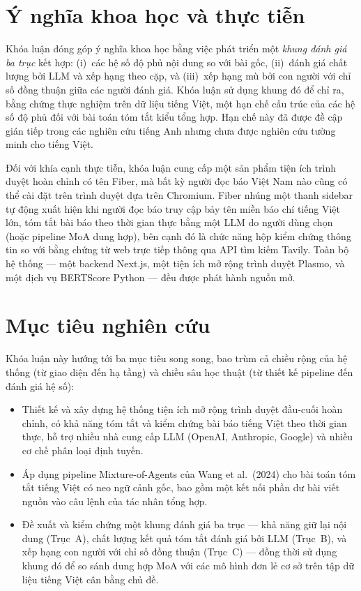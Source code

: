 \section*{Ý nghĩa khoa học và thực tiễn}

Khóa luận đóng góp ý nghĩa khoa học bằng việc phát triển một \textit{khung đánh giá ba trục} kết hợp: (i)~các hệ số độ phủ
nội dung so với bài gốc, (ii)~đánh giá chất lượng bởi LLM và xếp hạng theo
cặp, và (iii)~xếp hạng mù bởi con người với chỉ số đồng thuận giữa các người đánh giá.
Khóa luận sử dụng khung đó để chỉ ra, bằng chứng thực nghiệm trên dữ liệu tiếng
Việt, một hạn chế cấu trúc của các hệ số độ phủ đối với bài toán tóm tắt kiểu tổng
hợp. Hạn chế này đã được đề cập gián tiếp trong các nghiên cứu tiếng Anh
\cite{Wang2024,Zheng2023} nhưng chưa được nghiên cứu tường minh cho tiếng Việt.

Đối với khía cạnh thực tiễn, khóa luận cung cấp một sản phẩm tiện ích trình duyệt hoàn chỉnh có tên Fiber, mà bất
kỳ người đọc báo Việt Nam nào cũng có thể cài đặt trên trình duyệt dựa trên Chromium.
Fiber nhúng một thanh sidebar tự động xuất hiện khi người đọc báo truy cập bảy tên miền báo chí tiếng Việt lớn, tóm tắt bài
báo theo thời gian thực bằng một LLM do người dùng chọn (hoặc pipeline MoA dung hợp),
bên cạnh đó là chức năng hộp kiểm chứng thông tin so với bằng chứng từ web trực tiếp thông qua API tìm kiếm
Tavily. Toàn bộ hệ thống --- một backend Next.js, một tiện ích mở rộng trình duyệt
Plasmo, và một dịch vụ BERTScore Python --- đều được phát hành nguồn mở.

\section*{Mục tiêu nghiên cứu}

Khóa luận này hướng tới ba mục tiêu song song, bao trùm cả chiều rộng của hệ thống (từ giao diện đến hạ tầng) và chiều sâu học thuật (từ thiết kế pipeline đến đánh giá hệ số):

\begin{itemize}
  \item Thiết kế và xây dựng hệ thống tiện ích mở rộng trình duyệt đầu-cuối hoàn
        chỉnh, có khả năng tóm tắt và kiểm chứng bài báo tiếng Việt theo thời gian
        thực, hỗ trợ nhiều nhà cung cấp LLM (OpenAI, Anthropic, Google) và nhiều cơ chế
        phân loại định tuyến.
  \item Áp dụng pipeline Mixture-of-Agents của Wang et al.\ (2024) cho bài toán
        tóm tắt tiếng Việt có neo ngữ cảnh gốc, bao gồm một kết nối phần dư bài
        viết nguồn vào câu lệnh của tác nhân tổng hợp.
  \item Đề xuất và kiểm chứng một khung đánh giá ba trục --- khả năng giữ lại nội dung
        (Trục~A), chất lượng kết quả tóm tắt đánh giá bởi LLM (Trục~B), và xếp hạng
        con người với chỉ số đồng thuận (Trục~C) --- đồng thời sử dụng khung đó
        để so sánh dung hợp MoA với các mô hình đơn lẻ cơ sở trên tập dữ liệu
        tiếng Việt cân bằng chủ đề.
\end{itemize}

